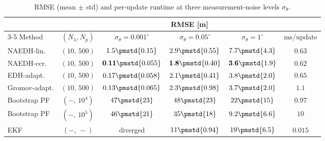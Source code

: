 \begin{table}[t]
\centering
\caption{RMSE (mean $\pm$ std) and per-update runtime at three measurement-noise levels $\sigma_\theta$.}
\label{tab:rmse}
\scriptsize
\setlength{\tabcolsep}{3pt}
\renewcommand{\arraystretch}{1.1}
\begin{tabular}{@{}l c ccc c@{}}
\toprule
 & & \multicolumn{3}{c}{RMSE [m]} & \\
\cmidrule(lr){3-5}
Method & $(N_\lambda, N_p)$
       & $\sigma_\theta=0.001^\circ$ & $\sigma_\theta=0.05^\circ$ & $\sigma_\theta=1^\circ$
       & ms/update \\
\midrule
NAEDH-lin.    & $(10,\,500)$          & $1.5 \pmstd{0.15}$ & $2.9 \pmstd{0.55}$ & $7.7 \pmstd{4.3}$ & $0.63$ \\
NAEDH-ccr.    & $(10,\,500)$          & $\mathbf{0.11} \pmstd{0.055}$ & $\mathbf{1.8} \pmstd{0.40}$ & $\mathbf{3.6} \pmstd{1.9}$ & $0.62$ \\
\midrule[0.3pt]
EDH-adapt.    & $(10,\,500)$          & $0.17 \pmstd{0.058}$ & $2.1 \pmstd{0.41}$ & $3.8 \pmstd{2.0}$ & $0.65$ \\
Gromov-adapt. & $(10,\,500)$          & $0.13 \pmstd{0.065}$ & $2.3 \pmstd{0.98}$ & $3.7 \pmstd{2.0}$ & $1.1$ \\
\midrule[0.3pt]
Bootstrap PF  & $(-,\,10^4)$          & $47 \pmstd{23}$ & $48 \pmstd{23}$ & $22 \pmstd{15}$ & $0.97$ \\
Bootstrap PF  & $(-,\,10^5)$          & $46 \pmstd{21}$ & $35 \pmstd{18}$ & $9.2 \pmstd{6.6}$ & $10$ \\
EKF           & $(-,\,-)$             & diverged & $11 \pmstd{0.94}$ & $19 \pmstd{6.5}$ & $0.015$ \\
\bottomrule
\end{tabular}
\end{table}
